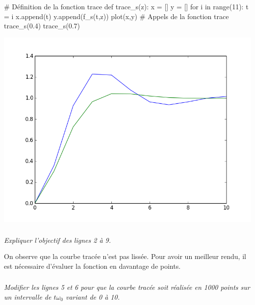 \documentclass[10pt]{article}
\newif\ifprof
\begin{document}
\begin{minipage}[c]{.48\linewidth}
\begin{py}
\begin{python}
# Définition de la fonction trace
def trace_s(z):
    x = []
    y = []
    for i in range(11):
        t = i
        x.append(t)
        y.append(f_s(t,z))
    plot(x,y)
# Appels de la fonction trace
trace_s(0.4)
trace_s(0.7)

\end{python}
\end{py}
\end{minipage} \hfill
\begin{minipage}[c]{.48\linewidth}
\begin{center}
\includegraphics[width=\textwidth]{images/courbe}
\end{center}
\end{minipage}

\subparagraph{}
\textit{Expliquer l'objectif des lignes 2 à 9.}

\vspace{.25cm}

On observe que la courbe tracée n'est pas lissée. Pour avoir un meilleur rendu, il est nécessaire d'évaluer la fonction en davantage de points. 

\subparagraph{}
\textit{Modifier les lignes 5 et 6 pour que la courbe tracée soit réalisée en 1000 points sur un intervalle de $t \omega_0$ variant de 0 à 10. }

\ifprof
\begin{corrige}
\begin{py}
\begin{python}
def trace_s(z):
    x = []
    y = []
    n = 1000
    for i in range(n+1):
        t = 10*i/n
        x.append(t)
        y.append(f_s(t,z))
    plot(x,y)
\end{python}
\end{py}
\end{corrige}
\else
\fi
\end{document}
